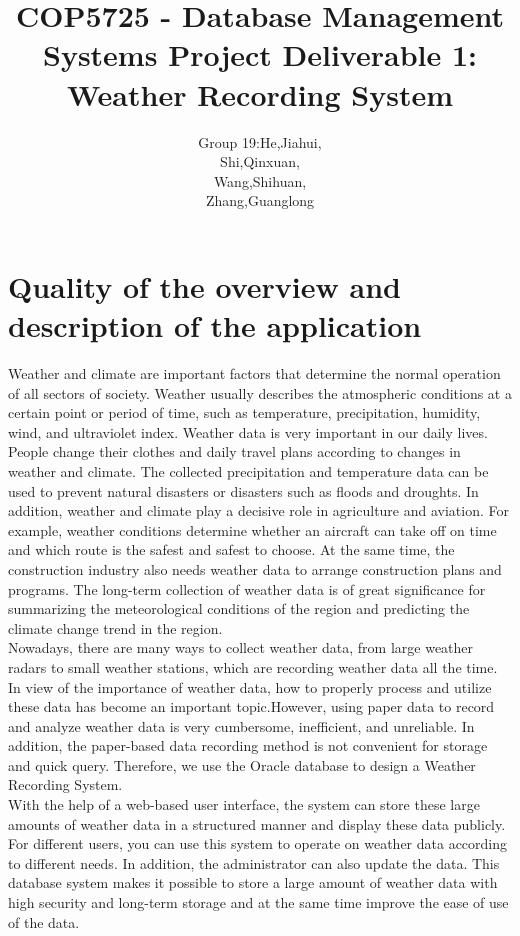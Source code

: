 \documentclass[]{article}
\title{\Huge COP5725 - Database Management Systems\vspace{2.8em} \LARGE \textbf{Project Deliverable 1:} Weather Recording System}
\author{
	\Large Group 19:\qquad He,Jiahui,\\
	\Large \qquad\qquad\qquad\qquad Shi,Qinxuan,\\
	\Large \qquad\qquad\qquad\qquad Wang,Shihuan,\\
	\Large \qquad\qquad\qquad\qquad\qquad Zhang,Guanglong
}
\date{}
\begin{document}
\maketitle
\clearpage

\tableofcontents
\clearpage

\section{Quality of the overview and description of the application}

	Weather and climate are important factors that determine the normal operation of all sectors of society. Weather usually describes the atmospheric conditions at a certain point or period of time, such as temperature, precipitation, humidity, wind, and ultraviolet index. Weather data is very important in our daily lives. People change their clothes and daily travel plans according to changes in weather and climate. The collected precipitation and temperature data can be used to prevent natural disasters or disasters such as floods and droughts. In addition, weather and climate play a decisive role in agriculture and aviation. For example, weather conditions determine whether an aircraft can take off on time and which route is the safest and safest to choose. At the same time, the construction industry also needs weather data to arrange construction plans and programs. The long-term collection of weather data is of great significance for summarizing the meteorological conditions of the region and predicting the climate change trend in the region. \\
	
	\noindent Nowadays, there are many ways to collect weather data, from large weather radars to small weather stations, which are recording weather data all the time. In view of the importance of weather data, how to properly process and utilize these data has become an important topic.However, using paper data to record and analyze weather data is very cumbersome, inefficient, and unreliable. In addition, the paper-based data recording method is not convenient for storage and quick query. Therefore, we use the Oracle database to design a Weather Recording System. \\
	
	\noindent With the help of a web-based user interface, the system can store these large amounts of weather data in a structured manner and display these data publicly. For different users, you can use this system to operate on weather data according to different needs. In addition, the administrator can also update the data. This database system makes it possible to store a large amount of weather data with high security and long-term storage and at the same time improve the ease of use of the data. \\
	
\end{document}
